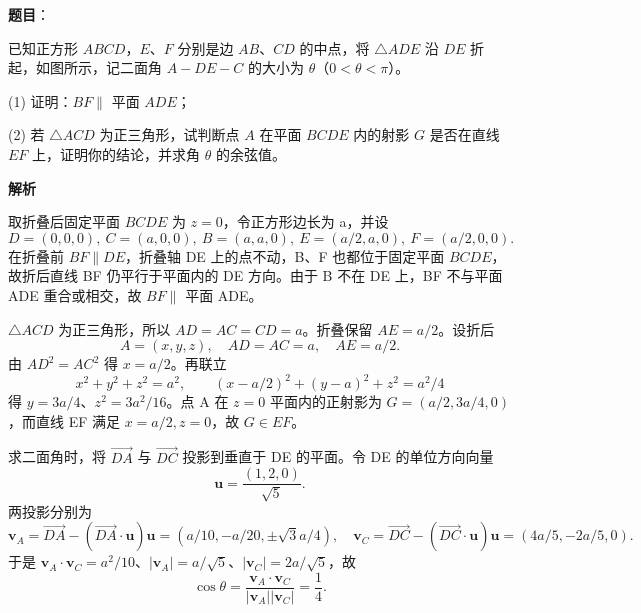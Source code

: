 \begin{answer}

\textbf{题目}：

已知正方形 \(ABCD\)，\(E、F\) 分别是边 \(AB、CD\) 的中点，将 \(\triangle ADE\) 沿 \(DE\) 折起，如图所示，记二面角 \(A-DE-C\) 的大小为 \(\theta\)（\(0<\theta<\pi\)）。

(1) 证明：\(BF\parallel\) 平面 \(ADE\)；

(2) 若 \(\triangle ACD\) 为正三角形，试判断点 \(A\) 在平面 \(BCDE\) 内的射影 \(G\) 是否在直线 \(EF\) 上，证明你的结论，并求角 \(\theta\) 的余弦值。
\nopagebreak[4]
\begin{center}\end{center}
\nopagebreak[4]
\textbf{解析}


取折叠后固定平面 $BCDE$ 为 $z=0$，令正方形边长为 a，并设
\nopagebreak[4]
\[
D=(0,0,0),\ C=(a,0,0),\ B=(a,a,0),\ E=(a/2,a,0),\ F=(a/2,0,0).
\]
在折叠前 $BF\parallel DE$，折叠轴 DE 上的点不动，B、F 也都位于固定平面 $BCDE$，故折后直线 BF 仍平行于平面内的 DE 方向。由于 B 不在 DE 上，BF 不与平面 ADE 重合或相交，故 $BF\parallel$ 平面 ADE。


$\triangle ACD$ 为正三角形，所以 $AD=AC=CD=a$。折叠保留 $AE=a/2$。设折后
\nopagebreak[4]
\[
A=(x,y,z),\quad AD=AC=a,\quad AE=a/2.
\]
由 $AD^2=AC^2$ 得 $x=a/2$。再联立
\nopagebreak[4]
\[
x^2+y^2+z^2=a^2,\qquad
(x-a/2)^2+(y-a)^2+z^2=a^2/4
\]
得 $y=3a/4$、$z^2=3a^2/16$。点 A 在 $z=0$ 平面内的正射影为 $G=(a/2,3a/4,0)$，而直线 EF 满足 $x=a/2,z=0$，故 $G\in EF$。

求二面角时，将 $\overrightarrow{DA}$ 与 $\overrightarrow{DC}$ 投影到垂直于 DE 的平面。令 DE 的单位方向向量
\nopagebreak[4]
\[
\mathbf u=\frac{(1,2,0)}{\sqrt5}.
\]
两投影分别为
\nopagebreak[4]
\[
\mathbf v_A=\overrightarrow{DA}-(\overrightarrow{DA}\cdot\mathbf u)\mathbf u
=(a/10,-a/20,\pm\sqrt3a/4),\quad
\mathbf v_C=\overrightarrow{DC}-(\overrightarrow{DC}\cdot\mathbf u)\mathbf u
=(4a/5,-2a/5,0).
\]
于是 $\mathbf v_A\cdot\mathbf v_C=a^2/10$、$|\mathbf v_A|=a/\sqrt5$、$|\mathbf v_C|=2a/\sqrt5$，故
\nopagebreak[4]
\[
\cos\theta=\frac{\mathbf v_A\cdot\mathbf v_C}{|\mathbf v_A||\mathbf v_C|}=\frac14.
\]
\nopagebreak[4]
\begin{center}\end{center}
\nopagebreak[4]


\end{answer}
